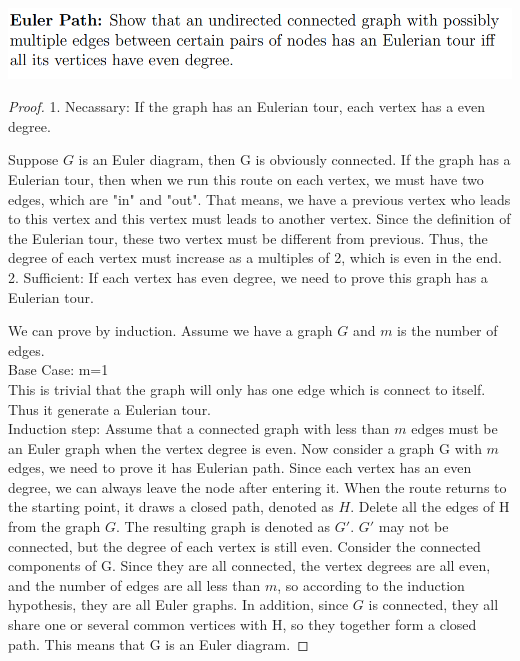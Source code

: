 \documentclass[12pt]{article}
\begin{document}
\includegraphics[scale=0.4]{2.png}
\begin{proof}
	1. Necassary: If the graph has an Eulerian tour, each vertex has a even degree.
	
	Suppose $G$ is an Euler diagram, then G is obviously connected. If the graph has a Eulerian tour, then when we run this route on each vertex, we must have two edges, which are "in" and "out". That means, we have a previous vertex who leads to this vertex and this vertex must leads to another vertex. Since the definition of the Eulerian tour, these two vertex must be different from previous. Thus, the degree of each vertex must increase as a multiples of 2, which is even in the end.\\
	2. Sufficient: If each vertex has even degree, we need to prove this graph has a Eulerian tour.
	
	We can prove by induction. Assume we have a graph $G$ and $m$ is the number of edges. \\
	Base Case: m=1\\
	This is trivial that the graph will only has one edge which is connect to itself. Thus it generate a Eulerian tour.\\
	Induction step: Assume that a connected graph with less than $m$ edges must be an Euler graph when the vertex degree is even. Now consider a graph G with $m$ edges, we need to prove it has Eulerian path. Since each vertex has an even degree, we can always leave the node after entering it. When the route returns to the starting point, it draws a closed path, denoted as $H$. Delete all the edges of H from the graph $G$. The resulting graph is denoted as $G'$. $G'$ may not be connected, but the degree of each vertex is still even. Consider the connected components of G. Since they are all connected, the vertex degrees are all even, and the number of edges are all less than $m$, so according to the induction hypothesis, they are all Euler graphs. In addition, since $G$ is connected, they all share one or several common vertices with H, so they together form a closed path. This means that G is an Euler diagram.
	
\end{proof}
\end{document}

